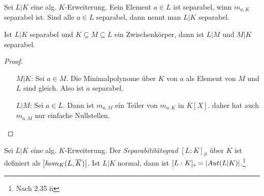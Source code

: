 \documentclass[../main.tex]{subfiles}
\begin{document}
\begin{definition}
    Sei $L|K$ eine alg. $K$-Erweiterung.
    Eein Element $a\in L$ ist separabel, winn $m_{a,K}$ separabel ist.
    Sind alle $a\in L$ separabel, dann nennt man $L|K$ separabel.
\end{definition}

\begin{lemma}
    Ist $L|K$ separabel und $K\subseteq M \subseteq L$ ein Zwischenkörper, dann ist $L|M$ und $M|K$ separabel.
\end{lemma}
\begin{proof}
    \begin{enumerate}
        \item[$M|K$:] Sei $a\in M$. Die Minimalpolynome über $K$ von $a$ als Element von $M$ und $L$ sind gleich. Also ist $a$ separabel.
        \item[$L|M$:] Sei $a\in L$. Dann ist $m_{a,M}$ ein Teiler von $m_{a,K}$ in $\overline{K}[X]$.
        daher hat auch $m_{a,M}$ nur einfache Nullstellen.
    \end{enumerate}
\end{proof}

\begin{definition}
    Sei $L|K$ eine alg. $K$-Erweiterung.
    Der \emph{Separabititätsgrad} $[L:K]_S$ über $K$ ist definiert als $\left\vert hom_K(L,\overline{K}) \right\vert$.
    Ist $L|K$ normal, dann ist $[L:K]_s = \left\vert Aut(L|K) \right\vert$.\footnote{Nach 2.35 ii} 
\end{definition}
\end{document}
